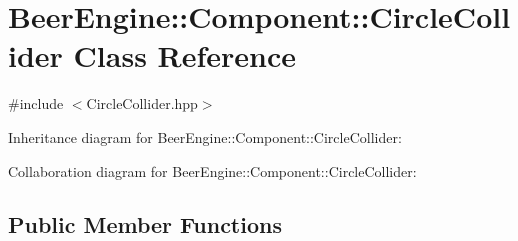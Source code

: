 \hypertarget{class_beer_engine_1_1_component_1_1_circle_collider}{}\section{Beer\+Engine\+:\+:Component\+:\+:Circle\+Collider Class Reference}
\label{class_beer_engine_1_1_component_1_1_circle_collider}


{\ttfamily \#include $<$Circle\+Collider.\+hpp$>$}



Inheritance diagram for Beer\+Engine\+:\+:Component\+:\+:Circle\+Collider\+:


Collaboration diagram for Beer\+Engine\+:\+:Component\+:\+:Circle\+Collider\+:
\subsection*{Public Member Functions}
